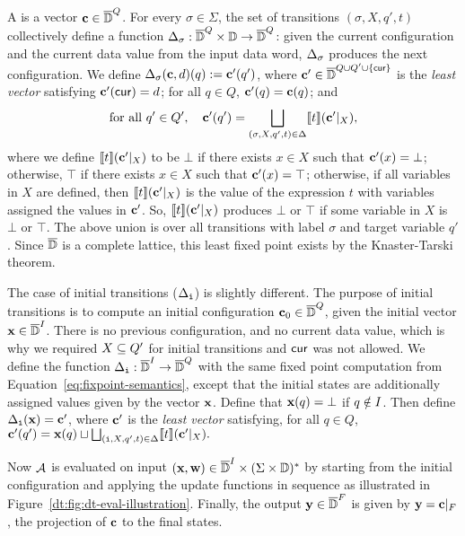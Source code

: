 A  is a vector $\textbf{c} \in \overline{\mathbb{D}{}}^Q$.
For every $\sigma \in \Sigma$, the set of transitions $(\sigma, X, q', t)$
collectively define a function $\Delta_\sigma : \overline{\mathbb{D}{}}^Q \times \mathbb{D} \to \overline{\mathbb{D}{}}^Q$:
given the current configuration and the current data value from the input data word,
$\Delta_\sigma$ produces the next configuration.
We define $\Delta_\sigma(\textbf{c},d)(q) := \textbf{c}'(q')$,
where $\textbf{c}' \in \overline{\mathbb{D}{}}^{Q \cup Q' \cup \{\mathsf{cur}\}}$ is the \emph{least vector} satisfying
$\textbf{c}'(\mathsf{cur}) = d$; for all $q \in Q$, $\textbf{c}'(q) = \textbf{c}(q)$;
and
\begin{equation}
\text{for all }q' \in Q',\quad
\textbf{c}'(q') = \bigsqcup_{(\sigma, X, q', t) \in \Delta} \llbracket t \rrbracket(\textbf{c}'|_X),
\label{dt:eq:fixpoint-semantics}
\end{equation}
where we define $\llbracket t \rrbracket(\textbf{c}'|_X)$ to be $\bot$ if there exists $x \in X$ such that $\textbf{c}'(x) = \bot$; otherwise, $\top$ if there exists $x \in X$ such that $\textbf{c}'(x) = \top$; otherwise, if all variables in $X$ are defined, then $\llbracket t \rrbracket(\textbf{c}'|_X)$ is the value of the expression $t$ with variables assigned the values in $\textbf{c}'$.
So, $\llbracket t \rrbracket(\textbf{c}'|_X)$ produces $\bot$ or $\top$ if some variable in $X$ is $\bot$ or $\top$.
The above union is over all transitions with label $\sigma$ and target variable $q'$.
Since $\overline{\mathbb{D}{}}$ is a complete lattice, this least fixed point exists by the Knaster-Tarski theorem.

The case of initial transitions ($\Delta_{\texttt{i}}$) is slightly different. The purpose of initial transitions is to compute an initial configuration $\textbf{c}_0 \in \overline{\mathbb{D}{}}^{Q}$, given the initial vector $\textbf{x} \in \overline{\mathbb{D}{}}^I$. There is no previous configuration, and no current data value, which is why we required $X \subseteq Q'$ for initial transitions and $\mathsf{cur}$ was not allowed.
We define the function $\Delta_{\texttt{i}}: \overline{\mathbb{D}{}}^I \to \overline{\mathbb{D}{}}^Q$ with the same fixed point computation from Equation~\eqref{eq:fixpoint-semantics}, except that the initial states are additionally assigned values given by the vector $\textbf{x}$. Define that $\textbf{x}(q) = \bot$ if $q \notin I$. Then define $\Delta_{\texttt{i}}(\textbf{x}) = \textbf{c}'$, where $\textbf{c}'$ is the \emph{least vector} satisfying, for all $q \in Q$,
$\textbf{c}'(q') = \textbf{x}(q) \sqcup \bigsqcup_{(\texttt{i}, X, q', t) \in \Delta} \llbracket t \rrbracket(\textbf{c}'|_X).$

Now $\mathcal{A}$ is evaluated on input
$(\textbf{x}, \textbf{w}) \in \overline{\mathbb{D}{}}^I \times (\Sigma \times \mathbb{D})^*$
by starting from the initial configuration and applying the update functions in sequence as illustrated in
Figure~\ref{dt:fig:dt-eval-illustration}.
Finally, the output $\textbf{y} \in \overline{\mathbb{D}{}}^F$ is given by $\textbf{y} = \textbf{c}|_{F}$, the projection of $\textbf{c}$ to the final states.

